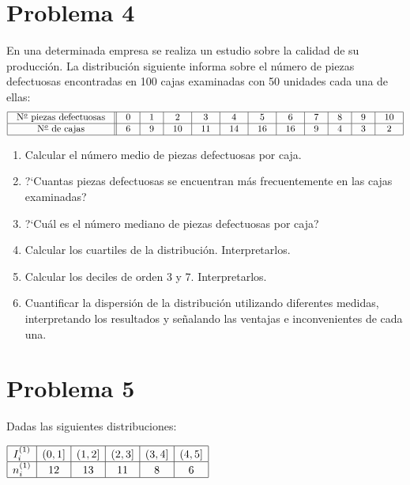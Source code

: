 \documentclass{article}
\begin{document}
	\color{black}
	
	
	
	
	\section{Problema 4}
	\color{blue}
	En una determinada empresa se realiza un estudio sobre la calidad de su
	producci{\'o}n. La distribuci{\'o}n siguiente informa sobre el n{\'u}mero de  piezas
	defectuosas encontradas en 100 cajas examinadas con 50 unidades cada una
	de ellas:
	$$\setlength{\arraycolsep}{10pt}
	\begin{array}{|c||c|c|c|c|c|c|c|c|c|c|c|} \hline
	\mbox{N${}^{\underline{o}}$ piezas defectuosas} & 0 & 1 & 2  & 3
	& 4  & 5  & 6  & 7 & 8 & 9 & 10 \\ \hline
	\mbox{N${}^{\underline{o}}$ de cajas}           & 6 & 9 & 10 & 11
	& 14 & 16 & 16 & 9 & 4 & 3 & 2 \\ \hline
	\end{array}
	$$
	
	\begin{enumerate}
		\item Calcular el n{\'u}mero medio de piezas defectuosas por caja.
		\item ?`Cuantas piezas defectuosas se encuentran m{\'a}s frecuentemente en las
		cajas examinadas?
		\item ?`Cu{\'a}l es el n{\'u}mero mediano de piezas defectuosas por caja?
		\item Calcular los cuartiles de la distribuci{\'o}n. Interpretarlos.
		\item Calcular los deciles de orden 3 y 7. Interpretarlos.
		\item Cuantificar la dispersi{\'o}n de la  distribuci{\'o}n utilizando diferentes
		medidas, interpretando los resultados  y se{\~n}alando las ventajas e
		inconvenientes de cada una. \\
	\end{enumerate}
	\color{black}
	
	
	
	
	\section{Problema 5}
	\color{blue}
	Dadas las siguientes distribuciones:
	
	\setlength{}{4pt}
	$\begin{array}{|c|c|c|c|c|c|} \hline
	I_{i}^{(1)} & (0,1] & (1,2] & (2,3] & (3,4] & (4,5] \\ \hline
	n_{i}^{(1)} & 12  & 13  &  11 &  8  &  6  \\ \hline
	\end{array}$
	
\end{document}
